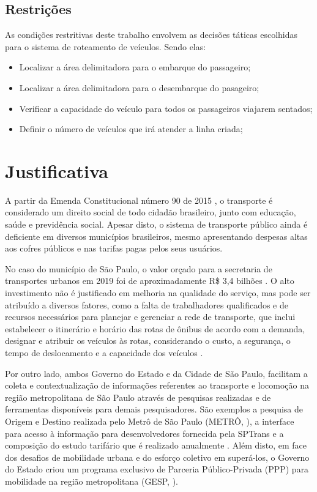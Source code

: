 \subsection{Restrições}
As condições restritivas deste trabalho envolvem as decisões táticas escolhidas para o sistema de roteamento de veículos. Sendo elas:
\begin{itemize}
    \item Localizar a área delimitadora para o embarque do passageiro;
    
    \item Localizar a área delimitadora para o desembarque do pasageiro;
    
    \item Verificar a capacidade do veículo para todos os passageiros viajarem sentados;
    
    \item Definir o número de veículos que irá atender a linha criada;
    
\end{itemize}

\section{Justificativa}
A partir da Emenda Constitucional número 90 de 2015 \cite{pec}, o transporte é considerado um direito social de todo cidadão brasileiro, junto com educação, saúde e previdência social. Apesar disto, o sistema de transporte público ainda é deficiente em diversos municípios brasileiros, mesmo apresentando despesas altas aos cofres públicos e nas tarifas pagas pelos seus usuários. 
 
No caso do município de São Paulo, o valor orçado para a secretaria de transportes urbanos em 2019 foi de aproximadamente R\$ 3,4 bilhões \cite{loatrans}. O alto investimento não é justificado em melhoria na qualidade do serviço, mas pode ser atribuído a diversos fatores, como a falta de trabalhadores qualificados e de recursos necessários para planejar e gerenciar a rede de transporte, que inclui estabelecer o itinerário e horário das rotas de ônibus de acordo com a demanda, designar e atribuir os veículos às rotas, considerando o custo, a segurança, o tempo de deslocamento e a capacidade dos veículos \cite{lima2016mixed}.

Por outro lado, ambos Governo do Estado e da Cidade de São Paulo, facilitam a coleta e contextualização de informações referentes ao transporte e locomoção na região metropolitana de São Paulo através de pesquisas realizadas e de ferramentas disponíveis para demais pesquisadores. São exemplos a pesquisa de Origem e Destino realizada pelo Metrô de São Paulo (METRÔ, \citeyear{odpq}), a interface para acesso à informação para desenvolvedores fornecida pela SPTrans \cite{sptranspq} e a composição do estudo tarifário que é realizado anualmente \cite{tarifapq}. Além disto, em face dos desafios de mobilidade urbana e do esforço coletivo em superá-los, o Governo do Estado criou um programa exclusivo de Parceria Público-Privada (PPP) para mobilidade na região metropolitana (GESP, \citeyear{ppppq}).

